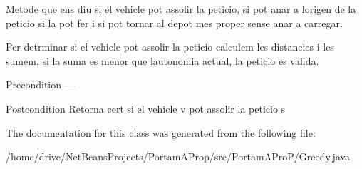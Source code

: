 Metode que ens diu si el vehicle pot assolir la peticio, si pot anar a l\textquotesingle{}origen de la peticio si la pot fer i si pot tornar al depot mes proper sense anar a carregar. 

Per detrminar si el vehicle pot assolir la peticio calculem les distancies i les sumem, si la suma es menor que l\textquotesingle{}autonomia actual, la peticio es valida. \begin{DoxyPrecond}{Precondition}
--- 
\end{DoxyPrecond}
\begin{DoxyPostcond}{Postcondition}
Retorna cert si el vehicle v pot assolir la peticio s 
\end{DoxyPostcond}


The documentation for this class was generated from the following file\+:\begin{DoxyCompactItemize}
\item 
/home/drive/\+Net\+Beans\+Projects/\+Portam\+A\+Prop/src/\+Portam\+A\+Pro\+P/Greedy.\+java\end{DoxyCompactItemize}
